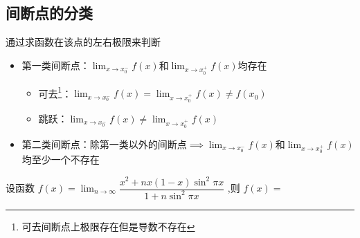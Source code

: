 \documentclass[8pt a4paper, oneside, UTF8]{ctexbook}
\begin{document}
\begin{sloppypar}
    \subsection{间断点的分类}
    通过求函数在该点的左右极限来判断
    \begin{itemize}
        \item 第一类间断点：$\lim _ { x \rightarrow x _ { 0 } ^{-}} f ( x )$​ 和$\lim _ { x \rightarrow x _ { 0 }^ {+}} f ( x )$​ 均存在
              \begin{itemize}
                  \item 可去\footnote{可去间断点上极限存在但是导数不存在}：$\lim _ { x \rightarrow x_0 ^ { - } } f ( x ) = \lim _ { x \rightarrow x_0^{+} } f  ( x ) \neq f(x_0)$
                  \item 跳跃：$\lim _ { x \rightarrow x_0^{-} } f ( x ) \not= \lim _ { x \rightarrow x_0^{+} } f ( x )$
              \end{itemize}
        \item 第二类间断点：除第一类以外的间断点$\implies \lim _ { x \rightarrow x _ { 0 } ^{-}} f ( x )$和$\lim _ { x \rightarrow x _ { 0 }^ {+}} f ( x )$​ 均至少一个不存在
    \end{itemize}
    \begin{problem}
     设函数 $f(x)=\lim_{n\to\infty}\dfrac{x^2+nx(1-x)\sin^2\pi x}{1+ n \sin^2 \pi x}$ ,则 $f(x)=$
    \end{problem}
\end{sloppypar}
\end{document}
